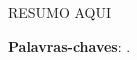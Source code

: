 % 
%
%
%		
%	
%









\begin{resumo}
    RESUMO AQUI

    \vspace{\onelineskip}
    
    \noindent
    \textbf{Palavras-chaves}: .
\end{resumo}


